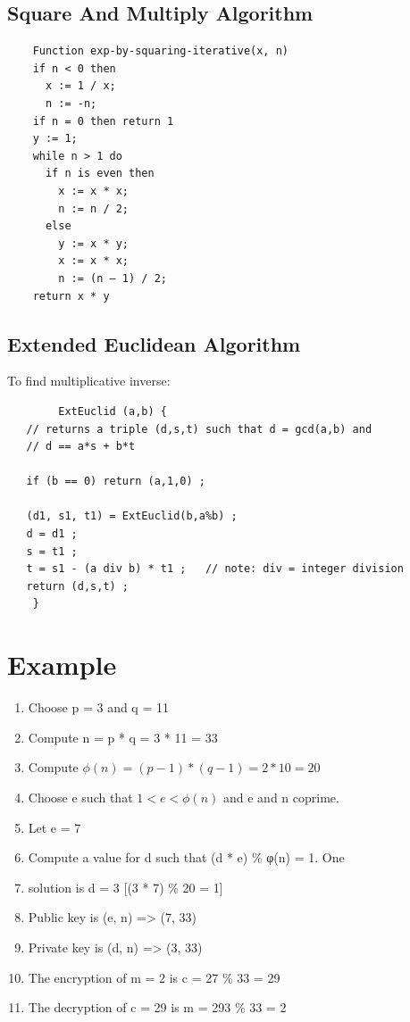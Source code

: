 \documentclass[a4paper,12pt]{article}
\begin{document}
    \subsection{Square And Multiply Algorithm}
    \begin{verbatim}
    Function exp-by-squaring-iterative(x, n)
    if n < 0 then
      x := 1 / x;
      n := -n;
    if n = 0 then return 1
    y := 1;
    while n > 1 do
      if n is even then 
        x := x * x;
        n := n / 2;
      else
        y := x * y;
        x := x * x;
        n := (n – 1) / 2;
    return x * y
    \end{verbatim}
    \subsection{Extended Euclidean Algorithm}
    To find multiplicative inverse: 
	
	\begin{verbatim}
    	ExtEuclid (a,b) {
   // returns a triple (d,s,t) such that d = gcd(a,b) and
   // d == a*s + b*t

   if (b == 0) return (a,1,0) ;
   
   (d1, s1, t1) = ExtEuclid(b,a%b) ;
   d = d1 ;
   s = t1 ;
   t = s1 - (a div b) * t1 ;   // note: div = integer division
   return (d,s,t) ;
    }
    \end{verbatim}
    
\section{Example}
\begin{enumerate}
    \item Choose p = 3 and q = 11
    \item Compute n = p * q = 3 * 11 = 33
    \item Compute $\phi(n) = (p - 1) * (q - 1) = 2 * 10 = 20$
    \item Choose e such that $1 < e < \phi(n)$ and e and n coprime. \item Let e = 7
    \item Compute a value for d such that (d * e) \% φ(n) = 1. One \item solution is d = 3 [(3 * 7) \% 20 = 1]
    \item Public key is (e, n) => (7, 33)
    \item Private key is (d, n) => (3, 33)
    \item The encryption of m = 2 is c = 27 \% 33 = 29
    \item The decryption of c = 29 is m = 293 \% 33 = 2
\end{enumerate}
    
\end{document}
